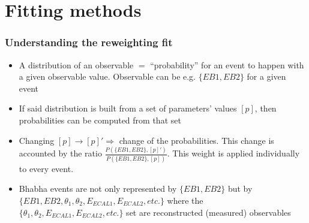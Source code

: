 \documentclass[handout]{beamer}
\begin{document}
\section{Fitting methods}
\begin{frame}
\frametitle{Understanding the reweighting fit}
\begin{itemize}
  \item A \alert{distribution} of an observable $=$ \alert{``probability''} for
  an event to happen with a given observable value. Observable can be e.g.
  $\{EB1,EB2\}$ for a given event%
  \item If said distribution is built from a set of parameters' values
  $[p]$, then probabilities can be computed from that set
  \item Changing $[p]\to [p]'\Rightarrow$ change of the probabilities. This
  change is accounted by the ratio $\frac{P(\{EB1,EB2\},
  [p]')}{P(\{EB1,EB2\},[p])}$. This weight is applied individually to every
  event.
  \item Bhabha events are not only represented by $\{EB1,EB2\}$ but by
  $\{EB1,EB2,\theta_1,\theta_2,E_{ECAL1},E_{ECAL2},etc.\}$ where the
  $\{\theta_1,\theta_2,E_{ECAL1},E_{ECAL2},etc.\}$ set are reconstructed
  (measured) observables
\end{itemize}
\end{frame}
\end{document}
